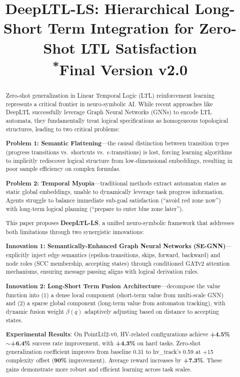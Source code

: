 \documentclass[conference]{IEEEtran}
\begin{document}
\title{DeepLTL-LS: Hierarchical Long-Short Term Integration for Zero-Shot LTL Satisfaction\\
{\footnotesize \textsuperscript{*}Final Version v2.0}}

\author{
}

\maketitle

\begin{abstract}
Zero-shot generalization in Linear Temporal Logic (LTL) reinforcement learning represents a critical frontier in neuro-symbolic AI. While recent approaches like DeepLTL successfully leverage Graph Neural Networks (GNNs) to encode LTL automata, they fundamentally treat logical specifications as homogeneous topological structures, leading to two critical problems: 

\textbf{Problem 1: Semantic Flattening}---the causal distinction between transition types (progress transitions vs.\ shortcuts vs.\ $\epsilon$-transitions) is lost, forcing learning algorithms to implicitly rediscover logical structure from low-dimensional embeddings, resulting in poor sample efficiency on complex formulas. 

\textbf{Problem 2: Temporal Myopia}---traditional methods extract automaton states as static global embeddings, unable to dynamically leverage task progress information. Agents struggle to balance immediate sub-goal satisfaction (``avoid red zone now'') with long-term logical planning (``prepare to enter blue zone later'').

This paper proposes \textbf{DeepLTL-LS}, a unified neuro-symbolic framework that addresses both limitations through two synergistic innovations: 

\textbf{Innovation 1: Semantically-Enhanced Graph Neural Networks (SE-GNN)}---explicitly inject edge semantics (epsilon-transitions, skips, forward, backward) and node roles (SCC membership, accepting states) through conditioned GATv2 attention mechanisms, ensuring message passing aligns with logical derivation rules. 

\textbf{Innovation 2: Long-Short Term Fusion Architecture}---decompose the value function into (1) a dense local component (short-term value from multi-scale GNN) and (2) a sparse global component (long-term value from automaton tracking), with dynamic fusion weight $\beta(q)$ adaptively adjusting based on distance to accepting states.

\textbf{Experimental Results}: On PointLtl2-v0, HV-related configurations achieve \textbf{+4.5\%$\sim$+6.4\%} success rate improvement, with \textbf{+4.3\%} on hard tasks. Zero-shot generalization coefficient improves from baseline 0.31 to hv\_track's 0.59 at $+$15 complexity offset (\textbf{90\%} improvement). Average reward increases by \textbf{+7.3\%}. These gains demonstrate more robust and efficient learning across task scales.
\end{abstract}
\end{document}
